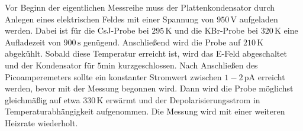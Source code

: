 Vor Beginn der eigentlichen Messreihe muss der Plattenkondensator durch Anlegen eines elektrischen Feldes mit einer Spannung von $950 \,\si{\volt}$ aufgeladen werden.
Dabei ist für die CsJ-Probe bei $295 \,\si{\kelvin}$ und die KBr-Probe bei $320 \,\si{\kelvin}$ eine Aufladezeit von $900 \,\si{\second}$ genügend.
Anschließend wird die Probe auf $210 \,\si{\kelvin}$ abgekühlt.
Sobald diese Temperatur erreicht ist, wird das E-Feld abgeschaltet und der Kondensator für $5 \si{\minute}$ kurzgeschlossen.
Nach Anschließen des Picoamperemeters sollte ein konstanter Stromwert zwischen $1-2 \,\si{\pico\ampere}$ erreicht werden, bevor mit der Messung begonnen wird.
Dann wird die Probe möglichst gleichmäßig auf etwa $330 \,\si{\kelvin}$ erwärmt und der Depolarisierungsstrom in Temperaturabhängigkeit aufgenommen.
Die Messung wird mit einer weiteren Heizrate wiederholt.